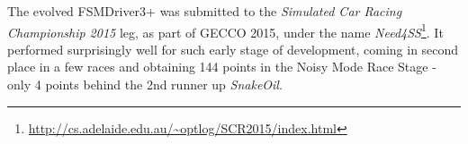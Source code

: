 The evolved FSMDriver3+ was submitted to the \emph{Simulated Car Racing Championship 2015} leg, as part of GECCO 2015, under the name \emph{Need4SS}\footnote{\url{http://cs.adelaide.edu.au/~optlog/SCR2015/index.html}}. It performed surprisingly well for such early stage of development, coming in second place in a few races and obtaining 144 points in the Noisy Mode Race Stage - only 4 points behind the 2nd runner up \emph{SnakeOil}.

